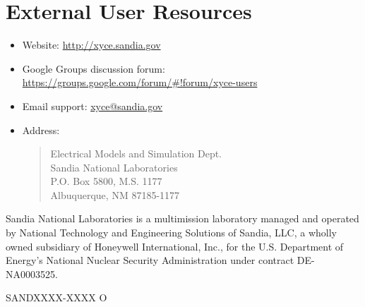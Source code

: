 \documentclass[letterpaper]{scrartcl}
\begin{document}
\section{External User Resources}
\begin{itemize}
  \item Website: {\color{XyceDeepRed}\url{http://xyce.sandia.gov}}
  \item Google Groups discussion forum:
    {\color{XyceDeepRed}\url{https://groups.google.com/forum/#!forum/xyce-users}}
  \item Email support:
    {\color{XyceDeepRed}\href{mailto:xyce@sandia.gov}{xyce@sandia.gov}}
  \item Address:
    \begin{quote}
            Electrical Models and Simulation Dept.\\
            Sandia National Laboratories\\
            P.O. Box 5800, M.S. 1177\\
            Albuquerque, NM 87185-1177 \\
    \end{quote}
\end{itemize}

\vspace*{\fill}
\noindent
Sandia National Laboratories is a multimission laboratory managed and
operated by National Technology and Engineering Solutions of Sandia,
LLC, a wholly owned subsidiary of Honeywell International, Inc., for
the U.S. Department of Energy's National Nuclear Security
Administration under contract DE-NA0003525.

SANDXXXX-XXXX O
\end{document}
